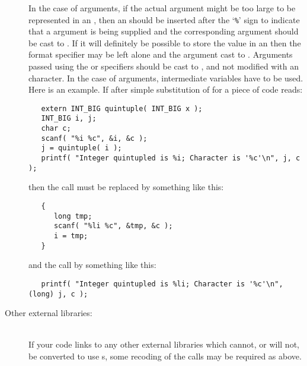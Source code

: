 \documentclass[twoside,11pt]{article}
\renewcommand{\_}{\texttt{\symbol{95}}}
\begin{document}
\begin{description}
In the case of  arguments, if the actual argument
might be too large to be
represented in an , then an  should be inserted 
after the `{\tt\%}' sign to 
indicate that a  argument is being supplied and the 
corresponding argument should be cast to .  If it will definitely
be possible to store the value in an  then the format specifier
may be left alone and the argument cast to .
Arguments passed using the  or \cc{*} specifiers should be cast 
to , and not modified with an  character.
In the case of  arguments, intermediate variables have to be used.
Here is an example.  If after simple substitution of \cc{INT\_BIG} for
 a piece of code reads:
\begin{squote}
\begin{verbatim}
   extern INT_BIG quintuple( INT_BIG x );
   INT_BIG i, j;
   char c;
   scanf( "%i %c", &i, &c );
   j = quintuple( i );
   printf( "Integer quintupled is %i; Character is '%c'\n", j, c );
\end{verbatim}
\end{squote}
then the  call must be replaced by something like this: 
\begin{squote}
\begin{verbatim}
   {  
      long tmp; 
      scanf( "%li %c", &tmp, &c ); 
      i = tmp; 
   }
\end{verbatim}
\end{squote}
and the  call by something like this:
\begin{squote}
\begin{verbatim}
   printf( "Integer quintupled is %li; Character is '%c'\n", (long) j, c );
\end{verbatim}
\end{squote}
%
\item[Other external libraries:]\mbox{}
\\
If your code links to any other external libraries
which cannot, or will not, be converted to use \cc{INT\_BIG}s,
some recoding of the calls may be required as above.
\end{description}
\end{document}
